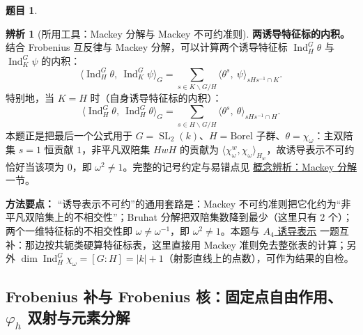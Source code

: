 \documentclass[a4paper]{ctexart}
\theoremstyle{definition}
\newtheorem{example}{题目}[section]
\theoremstyle{analysis}
\newtheorem{remark}{辨析}[section]
\theoremstyle{plain}
\begin{document}
\begin{example}
\begin{remark}[所用工具：Mackey 分解与 Mackey 不可约准则]
\textbf{两诱导特征标的内积。} 结合 Frobenius 互反律与 Mackey 分解，可以计算两个诱导特征标 \(\operatorname{Ind}_H^G\theta\) 与 \(\operatorname{Ind}_K^G\psi\) 的内积：
\[
  \langle\operatorname{Ind}_H^G\theta,\ \operatorname{Ind}_K^G\psi\rangle_G
  =
  \sum_{s\in K\backslash G/H}
  \langle\theta^s,\ \psi\rangle_{sHs^{-1}\cap K}.
\]
特别地，当 \(K=H\) 时（自身诱导特征标的内积）：
\[
  \langle\operatorname{Ind}_H^G\theta,\ \operatorname{Ind}_H^G\theta\rangle_G
  =
  \sum_{s\in H\backslash G/H}
  \langle\theta^s,\ \theta\rangle_{sHs^{-1}\cap H}.
\]
本题正是把最后一个公式用于 \(G=\operatorname{SL}_2(k)\)、\(H=\text{Borel 子群}\)、\(\theta=\chi_\omega\)：主双陪集 \(s=1\) 恒贡献 \(1\)，非平凡双陪集 \(HwH\) 的贡献为 \(\langle\chi_\omega^w,\chi_\omega\rangle_{H_w}\)，故诱导表示不可约恰好当该项为 \(0\)，即 \(\omega^2\neq 1\)。完整的记号约定与易错点见 \hyperref[subsec:mackey-decomposition]{概念辨析：Mackey 分解} 一节。
\end{remark}

\textbf{方法要点：}
“诱导表示不可约”的通用套路是：Mackey 不可约准则把它化约为“非平凡双陪集上的不相交性”；Bruhat 分解把双陪集数降到最少（这里只有 2 个）；两个一维特征标的不相交性即 \(\omega\neq\omega^{-1}\)，即 \(\omega^2\neq 1\)。本题与 \hyperref[subsec:problem-serre-a4-induced-klein]{\(A_4\) 诱导表示} 一题互补：那边按共轭类硬算特征标表，这里直接用 Mackey 准则免去整张表的计算；另外 \(\dim\operatorname{Ind}_H^G\chi_\omega=[G:H]=|k|+1\)（射影直线上的点数），可作为结果的自检。
\end{example}

\subsection{\texorpdfstring{Frobenius 补与 Frobenius 核：固定点自由作用、\(\varphi_h\) 双射与元素分解}{Frobenius 补与 Frobenius 核：固定点自由作用、phih 双射与元素分解}}\label{subsec:problem-frobenius-complement-kernel}
\end{document}
